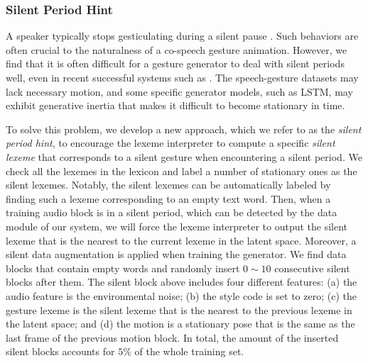 \subsubsection{Silent Period Hint}
A speaker typically stops gesticulating during a silent pause \citep{graziano2018silence}. Such behaviors are often crucial to the naturalness of a co-speech gesture animation. However, we find that it is often difficult for a gesture generator to deal with silent periods well, even in recent successful systems such as \citep{alexanderson2020style,kucherenko2020gesticulator}. The speech-gesture datasets may lack necessary motion, and some specific generator models, such as LSTM, may exhibit generative inertia that makes it difficult to become stationary in time.

To solve this problem, we develop a new approach, which we refer to as the \emph{silent period hint}, to encourage the lexeme interpreter to compute a specific \emph{silent lexeme} that corresponds to a silent gesture when encountering a silent period. 
We check all the lexemes in the lexicon and label a number of stationary ones as the silent lexemes. Notably, the silent lexemes can be automatically labeled by finding such a lexeme corresponding to an empty text word. Then, when a training audio block is in a silent period, which can be detected by the data module of our system, we will force the lexeme interpreter to output the silent lexeme that is the nearest to the current lexeme in the latent space.
Moreover, a silent data augmentation is applied when training the generator. We find data blocks that contain empty words and randomly insert $0\sim{}10$ consecutive silent blocks after them. The silent block above includes four different features: (a) the audio feature is the environmental noise; (b) the style code is set to zero; (c) the gesture lexeme is the silent lexeme that is the nearest to the previous lexeme in the latent space; and (d) the motion is a stationary pose that is the same as the last frame of the previous motion block. In total, the amount of the inserted silent blocks accounts for $5\%$ of the whole training set.